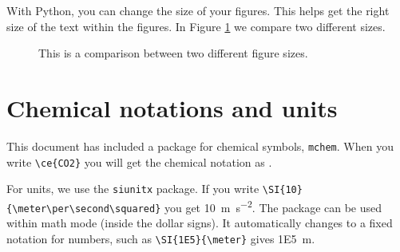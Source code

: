 With Python, you can change the size of your figures. This helps get the right size of the text within the figures. In Figure \ref{fig:SizeDiff} we compare two different sizes.

\begin{figure}[H]
  \centering
  \quad
  \caption{This is a comparison between two different figure sizes.}
\label{fig:SizeDiff}
\end{figure}


\section{Chemical notations and units}

This document has included a package for chemical symbols, \texttt{mchem}. When you write \verb=\ce{CO2}= you will get the chemical notation as .

For units, we use the \texttt{siunitx} package. If you write \verb=\SI{10}{\meter\per\second\squared}= you get \SI{10}{\meter\per\second\squared}. The package can be used within math mode (inside the dollar signs). It automatically changes to a fixed notation for numbers, such as \verb=\SI{1E5}{\meter}= gives \SI{1E5}{\meter}.

